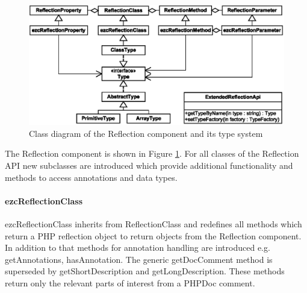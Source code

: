 \documentclass[10pt,final,a4paper,oneside]{article}
\begin{document}
\begin{figure}[htbp]
	\centering
		\includegraphics[width=1.00\textwidth]{figures/ezcReflection.eps}
	\caption{Class diagram of the Reflection component and its type system}
	\label{fig:ezcReflection}
\end{figure}


The Reflection component is shown in Figure \ref{fig:ezcReflection}.
For all classes of the Reflection API 
new subclasses are introduced
which provide additional functionality and methods to access
annotations and data types.

\paragraph{ezcReflectionClass}
ezcReflectionClass inherits from ReflectionClass
and redefines all methods which return a PHP reflection object
to return objects from the Reflection component.
In addition to that
methods for annotation handling
are introduced e.g. 
getAnnotations,
hasAnnotation.
The generic getDocComment method is superseded
by getShortDescription and getLongDescription.
These methods return only the relevant parts
of interest from a PHPDoc comment.

\end{document}
